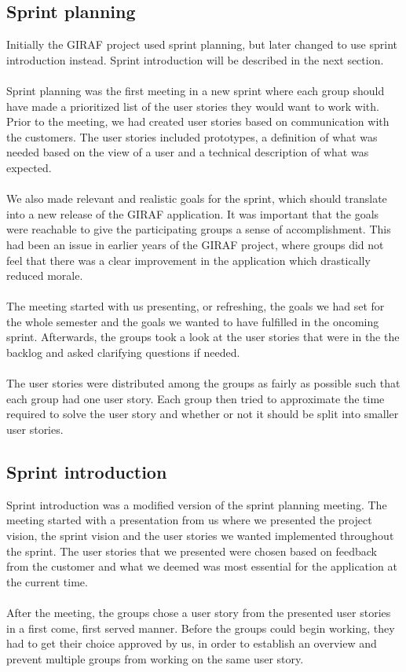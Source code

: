 \subsection{Sprint planning} \label{subsec:sprint-planning}
Initially the GIRAF project used sprint planning, but later changed to use sprint introduction instead.
Sprint introduction will be described in the next section.
\\
\\
Sprint planning was the first meeting in a new sprint where each group should have made a prioritized list of the user stories they would want to work with.
Prior to the meeting, we had created user stories based on communication with the customers.
The user stories included prototypes, a definition of what was needed based on the view of a user and a technical description of what was expected.
\\
\\
We also made relevant and realistic goals for the sprint, which should translate into a new release of the GIRAF application.
It was important that the goals were reachable to give the participating groups a sense of accomplishment.
This had been an issue in earlier years of the GIRAF project, where groups did not feel that there was a clear improvement in the application which drastically reduced morale.
\\
\\
The meeting started with us presenting, or refreshing, the goals we had set for the whole semester and the goals we wanted to have fulfilled in the oncoming sprint.
Afterwards, the groups took a look at the user stories that were in the the backlog and asked clarifying questions if needed.
\\
\\
The user stories were distributed among the groups as fairly as possible such that each group had one user story.
Each group then tried to approximate the time required to solve the user story and whether or not it should be split into smaller user stories.


\subsection{Sprint introduction} \label{subsec:sprint-introduction}
Sprint introduction was a modified version of the sprint planning meeting.
The meeting started with a presentation from us where we presented the project vision, the sprint vision and the user stories we wanted implemented throughout the sprint.
The user stories that we presented were chosen based on feedback from the customer and what we deemed was most essential for the application at the current time.
\\
\\
After the meeting, the groups chose a user story from the presented user stories in a first come, first served manner.
Before the groups could begin working, they had to get their choice approved by us, in order to establish an overview and prevent multiple groups from working on the same user story.

